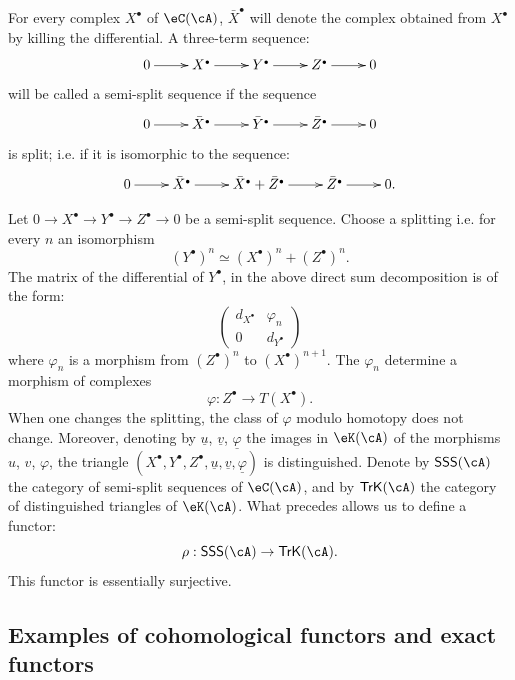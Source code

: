 For every complex $X^\bullet$ of $\eC(\cA)$, $\bar X^\bullet$ will denote the
complex obtained from $X^\bullet$ by killing the differential. A
three-term sequence: 
\[\xymatrix{
  0 \ar[r] 
    & X^\bullet \ar[r] 
    & Y^\bullet \ar[r] 
    & Z^\bullet \ar[r] 
    & 0 
}\]
will be called a semi-split sequence if the sequence 
\[\xymatrix{
  0 \ar[r] 
    & \bar X^\bullet \ar[r] 
    & \bar Y^\bullet \ar[r] 
    & \bar Z^\bullet \ar[r] 
    & 0 
}\]
is split; i.e. if it is isomorphic to the sequence: 
\[\xymatrix{
  0 \ar[r] 
    & \bar X^\bullet \ar[r] 
    & \bar X^\bullet + \bar Z^\bullet \ar[r] 
    & \bar Z^\bullet \ar[r] 
    & 0 \text{.}
}\]

Let $0 \to X^\bullet \to Y^\bullet \to Z^\bullet \to 0$ be a
semi-split sequence. Choose a splitting i.e. for every $n$ an isomorphism
\[
  (Y^\bullet)^n \simeq (X^\bullet)^n + (Z^\bullet)^n \text{.}
\]
The matrix of the differential of $Y^\bullet$, in the above direct sum
decomposition is of the form: 
\[
  \begin{pmatrix}
    d_{X^\bullet} & \varphi_n \\
    0 & d_{Y^\bullet} 
  \end{pmatrix}
\]
where $\varphi_n$ is a morphism from $(Z^\bullet)^n$ to
$(X^\bullet)^{n+1}$. The $\varphi_n$ determine a morphism of complexes
\[
  \varphi:Z^\bullet \to T(X^\bullet) \text{.}
\]
When one changes the splitting, the class of $\varphi$ modulo homotopy does
not change. Moreover, denoting by $\underline u$, $\underline v$,
$\underline\varphi$ the images in $\eK(\cA)$ of the morphisms $u$, $v$,
$\varphi$, the triangle
$(X^\bullet,Y^\bullet,Z^\bullet,\underline u,\underline v,\underline\varphi)$
is distinguished. Denote by $\mathsf{SSS}(\cA)$ the category of
semi-split sequences of $\eC(\cA)$, and by $\mathsf{TrK}(\cA)$ the
category of distinguished triangles of $\eK(\cA)$. What precedes
allows us to define a functor:
\[
  \rho:\mathsf{SSS}(\cA) \to \mathsf{TrK}(\cA) \text{.}
\]
This functor is essentially surjective. 










\subsection{Examples of cohomological functors and exact functors}\label{VIII:1-3}





